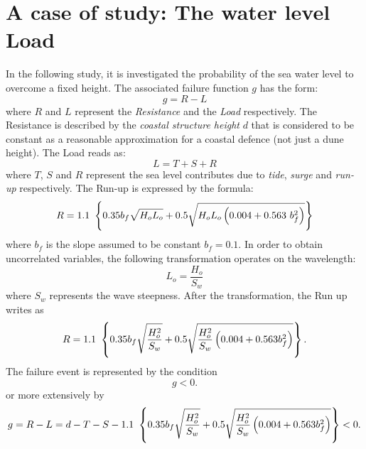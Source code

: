 \section{A case of study: The water level Load}
In the following study, it is investigated the probability of the sea water level to overcome a fixed height. The associated failure function $g$ has the form:
\begin{equation}
g=R-L
\end{equation}
where $R$ and $L$ represent the \textit{Resistance} and the \textit{Load} respectively. The Resistance is described by the \textit{coastal structure height} $d$ that is considered to be constant as a reasonable approximation for a coastal defence (not just a dune height). The Load reads as:
\begin{equation}
L = T + S + R
\end{equation}
where $T$, $S$ and $R$ represent the sea level contributes due to \textit{tide}, \textit{surge} and \textit{run-up} respectively. The Run-up is expressed by the formula:
\begin{equation*}
R=1.1~\left\lbrace 0.35b_{f}\sqrt{H_{o}L_{o}}+0.5\sqrt{H_{o}L_{o}\left( 0.004 + 0.563~b_{f}^{2} \right)} \right\rbrace
\end{equation*}
where $b_{f}$ is the slope assumed to be constant $b_{f} = 0.1$. In order to obtain uncorrelated variables, the following transformation operates on the wavelength:
\begin{equation*}
L_{o} = \frac {H_{o}} {S_{w}}
\end{equation*}
where $S_{w}$ represents the wave steepness.
After the transformation, the Run up writes as
\begin{equation*}
R=1.1~\left\lbrace 0.35b_{f}\sqrt{\frac {H_{o}^2} {S_{w}}}+0.5\sqrt{\frac {H_o^{2}} {S_{w}}\left( 0.004 + 0.563b_f^{2} \right)} \right\rbrace.
\end{equation*}
The failure event is represented by the condition
\begin{equation*}
g < 0.
\end{equation*}
or more extensively by
\begin{equation}
g=R-L=d - T - S - 1.1~\left\lbrace 0.35b_{f}\sqrt{\frac {H_{o}^2} {S_{w}}}+0.5\sqrt{\frac {H_o^{2}} {S_{w}}\left( 0.004 + 0.563b_f^{2} \right)} \right\rbrace < 0.
\end{equation}
